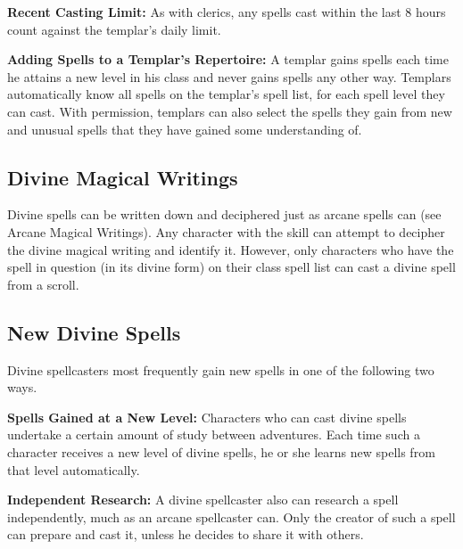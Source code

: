 \textbf{Recent Casting Limit:} As with clerics, any spells cast within the last 8 hours count against the templar's daily limit.

\textbf{Adding Spells to a Templar's Repertoire:} A templar gains spells each time he attains a new level in his class and never gains spells any other way. Templars automatically know all spells on the templar's spell list, for each spell level they can cast. With permission, templars can also select the spells they gain from new and unusual spells that they have gained some understanding of.

\subsection{Divine Magical Writings}
Divine spells can be written down and deciphered just as arcane spells can (see Arcane Magical Writings). Any character with the  skill can attempt to decipher the divine magical writing and identify it. However, only characters who have the spell in question (in its divine form) on their class spell list can cast a divine spell from a scroll.

\subsection{New Divine Spells}
Divine spellcasters most frequently gain new spells in one of the following two ways.

\textbf{Spells Gained at a New Level:} Characters who can cast divine spells undertake a certain amount of study between adventures. Each time such a character receives a new level of divine spells, he or she learns new spells from that level automatically.

\textbf{Independent Research:} A divine spellcaster also can research a spell independently, much as an arcane spellcaster can. Only the creator of such a spell can prepare and cast it, unless he decides to share it with others.